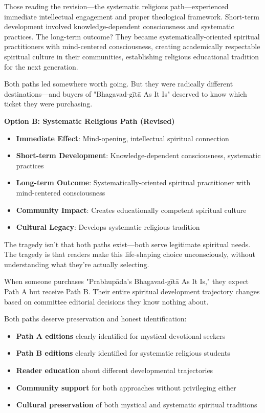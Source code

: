\documentclass[12pt,twoside]{book}
\begin{document}
Those reading the revision—the systematic religious path—experienced immediate intellectual engagement and proper theological framework. Short-term development involved knowledge-dependent consciousness and systematic practices. The long-term outcome? They became systematically-oriented spiritual practitioners with mind-centered consciousness, creating academically respectable spiritual culture in their communities, establishing religious educational tradition for the next generation.

Both paths led somewhere worth going. But they were radically different destinations—and buyers of "Bhagavad-gītā As It Is" deserved to know which ticket they were purchasing.

\textbf{\textbf{Option B: Systematic Religious Path (Revised)}}
\begin{itemize}
\item \textbf{\textbf{Immediate Effect}}: Mind-opening, intellectual spiritual connection
\item \textbf{\textbf{Short-term Development}}: Knowledge-dependent consciousness, systematic practices
\item \textbf{\textbf{Long-term Outcome}}: Systematically-oriented spiritual practitioner with mind-centered consciousness
\item \textbf{\textbf{Community Impact}}: Creates educationally competent spiritual culture
\item \textbf{\textbf{Cultural Legacy}}: Develops systematic religious tradition
\end{itemize}

The tragedy isn't that both paths exist—both serve legitimate spiritual needs. The tragedy is that readers make this life-shaping choice unconsciously, without understanding what they're actually selecting.

When someone purchases "Prabhupāda's Bhagavad-gītā As It Is," they expect Path A but receive Path B. Their entire spiritual development trajectory changes based on committee editorial decisions they know nothing about.

Both paths deserve preservation and honest identification:

\begin{itemize}
\item \textbf{\textbf{Path A editions}} clearly identified for mystical devotional seekers
\item \textbf{\textbf{Path B editions}} clearly identified for systematic religious students
\item \textbf{\textbf{Reader education}} about different developmental trajectories
\item \textbf{\textbf{Community support}} for both approaches without privileging either
\item \textbf{\textbf{Cultural preservation}} of both mystical and systematic spiritual traditions
\end{itemize}
\end{document}

